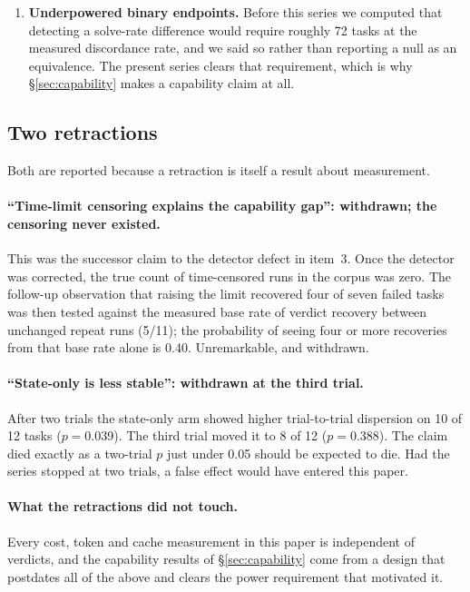 \begin{enumerate}
\item \textbf{Underpowered binary endpoints.} Before this series we computed
      that detecting a solve-rate difference would require roughly 72 tasks
      at the measured discordance rate, and we said so rather than reporting
      a null as an equivalence. The present series clears that requirement,
      which is why \S\ref{sec:capability} makes a capability claim at all.
\end{enumerate}

\subsection{Two retractions}

Both are reported because a retraction is itself a result about measurement.

\paragraph{``Time-limit censoring explains the capability gap'': withdrawn;
the censoring never existed.} This was the successor claim to the detector
defect in item~3. Once the detector was corrected, the true count of
time-censored runs in the corpus was zero. The follow-up observation that
raising the limit recovered four of seven failed tasks was then tested
against the measured base rate of verdict recovery between unchanged repeat
runs (\num{5}/\num{11}); the probability of seeing four or more recoveries
from that base rate alone is \num{0.40}\live. Unremarkable, and withdrawn.

\paragraph{``State-only is less stable'': withdrawn at the third trial.}
After two trials the state-only arm showed higher trial-to-trial dispersion
on 10 of 12 tasks ($p={}$\num{0.039}). The third trial moved it to 8 of 12
($p={}$\num{0.388}). The claim died exactly as a two-trial $p$ just under
\num{0.05} should be expected to die. Had the series stopped at two trials,
a false effect would have entered this paper.

\paragraph{What the retractions did not touch.} Every cost, token and cache
measurement in this paper is independent of verdicts, and the capability
results of \S\ref{sec:capability} come from a design that postdates all of
the above and clears the power requirement that motivated it.

